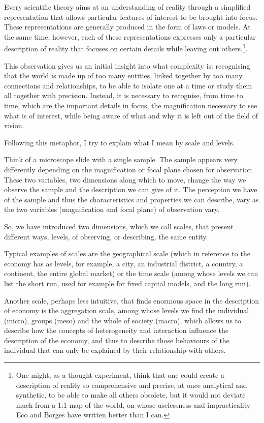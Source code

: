 Every scientific theory aims at an understanding of reality through a simplified representation that allows particular features of interest to be brought into focus. These representations are generally produced in the form of laws or models.
At the same time, however, each of these representations expresses only a particular description of reality that focuses on certain details while leaving out others.\footnote{One might, as a thought experiment, think that one could create a description of reality so comprehensive and precise, at once analytical and synthetic, to be able to make all others obsolete, but it would not deviate much from a 1:1 map of the world, on whose uselessness and impracticality Eco and Borges have written better than I can.}.

This observation gives us an initial insight into what complexity is: recognising that the world is made up of too many entities, linked together by too many connections and relationships, to be able to isolate one at a time or study them all together with precision. Instead, it is necessary to recognise, from time to time, which are the important details in focus, the magnification necessary to see what is of interest, while being aware of what and why it is left out of the field of vision.

Following this metaphor, I try to explain what I mean by scale and levels.

Think of a microscope slide with a single sample. The sample appears very differently depending on the magnification or focal plane chosen for observation.
These two variables, two dimensions along which to move, change the way we observe the sample and the description we can give of it.
The perception we have of the sample and thus the characteristics and properties we can describe, vary as the two variables (magnification and focal plane) of observation vary.

So, we have introduced two dimensions, which we call scales, that present different ways, levels, of observing, or describing, the same entity.

Typical examples of scales are the geographical scale (which in reference to the economy has as levels, for example, a city, an industrial district, a country, a continent, the entire
global market) or the time scale (among whose levels we can list the short run, used for example for fixed capital models, and the long run).

Another scale, perhaps less intuitive, that finds enormous space in the description of economy is the aggregation scale, among whose levels we find the individual (micro), groups (meso) and the whole of society (macro), which allows us to describe how the concepts of heterogeneity and interaction influence the description of the economy, and thus to describe those behaviours of the individual that can only be explained by their relationship with others.

